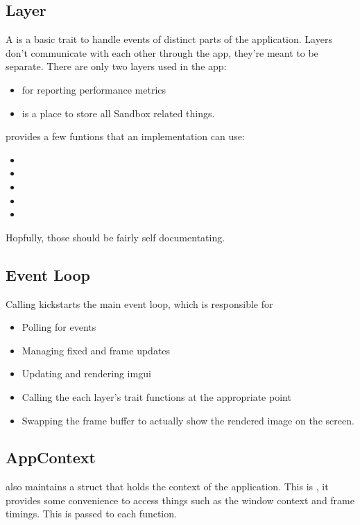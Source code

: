 \begin{multicols}{2}

  \subsection{Layer}
  A  is a basic trait to handle events of distinct parts of the application.
  Layers don't communicate with each other through the app, they're meant to be separate.
  There are only two layers used in the app:
  \begin{itemize}
    \item {} for reporting performance metrics
    \item {} is a place to store all Sandbox related things.
  \end{itemize}
   provides a few funtions that an implementation can use:
  \begin{itemize}
    \item {}
    \item {}
    \item {}
    \item {}
    \item {}
  \end{itemize}

  Hopfully, those should be fairly self documentating.

  \subsection{Event Loop}
  Calling  kickstarts the main event loop, which is responsible for
  \begin{itemize}
    \item Polling for events
    \item Managing fixed and frame updates
    \item Updating and rendering imgui
    \item Calling the each layer's  trait functions at the appropriate point
    \item Swapping the frame buffer to actually show the rendered image on the screen.
  \end{itemize}

  \subsection{AppContext}
   also maintains a struct that holds the context of the application.
  This is , it provides some convenience to access things such as the window context and frame timings.
  This is passed to each  function.


\end{multicols}
